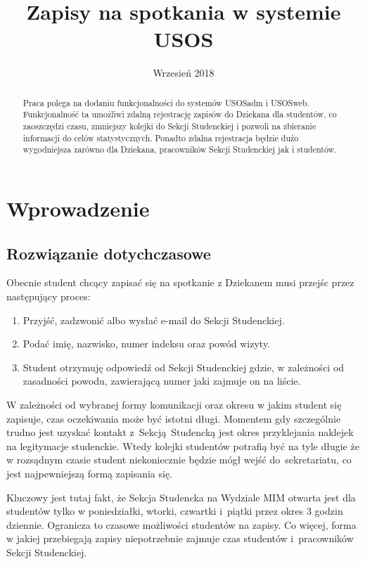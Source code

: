 \documentclass[licencjacka]{pracamgr}
\title{Zapisy na spotkania w systemie USOS}
\date{Wrzesień 2018}
\begin{document}
\maketitle

\begin{abstract}
  Praca polega na dodaniu funkcjonalności do systemów USOSadm i USOSweb.
  Funkcjonalność ta umożliwi zdalną rejestrację zapisów do Dziekana dla studentów, co zaoszczędzi czasu, zmniejszy kolejki do Sekcji Studenckiej i pozwoli na zbieranie informacji do celów statystycznych.
  Ponadto zdalna rejestracja będzie dużo wygodniejsza zarówno dla Dziekana, pracowników Sekcji Studenckiej jak i studentów.
\end{abstract}

\tableofcontents

\chapter{Wprowadzenie}
\section{Rozwiązanie dotychczasowe}
Obecnie student chcący zapisać się na spotkanie z Dziekanem musi przejśc przez następujący proces:
\begin{enumerate}
\item Przyjść, zadzwonić albo wysłać e-mail do Sekcji Studenckiej.
\item Podać imię, nazwisko, numer indeksu oraz powód wizyty.
\item Student otrzymuję odpowiedź od Sekcji Studenckiej gdzie, w zależności od zasadności powodu, zawierającą numer jaki zajmuje on na liście. 
\end{enumerate}
W zależności od wybranej formy komunikacji oraz okresu w jakim student się zapisuje, czas oczekiwania może być istotni długi. Momentem gdy szczególnie trudno jest uzyskać kontakt z~Sekcją~Studencką jest okres przyklejania naklejek na legitymacje studenckie. Wtedy kolejki studentów potrafią być na tyle długie że w rozsądnym czasie student niekoniecznie będzie mógł wejść do~sekretariatu, co jest najpewniejszą formą zapisania się.

Kluczowy jest tutaj fakt, że Sekcja Studencka na Wydziale MIM otwarta jest dla studentów tylko w poniedziałki, wtorki, czwartki i~piątki przez okres 3 godzin dziennie. Ogranicza to czasowe możliwości studentów na zapisy. Co więcej, forma w jakiej przebiegają zapisy niepotrzebnie zajmuje czas studentów i~pracowników Sekcji Studenckiej.
\end{document}
